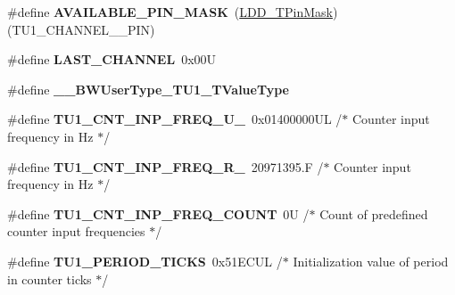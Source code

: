 \begin{DoxyCompactItemize}
\item 
\mbox{\label{group___t_u1__module_gaae26cc68396d232c9dd6aed25157fe4c}} 
\#define {\bfseries A\+V\+A\+I\+L\+A\+B\+L\+E\+\_\+\+P\+I\+N\+\_\+\+M\+A\+SK}~(\hyperlink{group___p_e___types__module_ga210dbf1d49dc5f9d5198e06ad4d96fc3}{L\+D\+D\+\_\+\+T\+Pin\+Mask})(T\+U1\+\_\+\+C\+H\+A\+N\+N\+E\+L\+\_\+\_\+\+P\+IN)
\item 
\mbox{\label{group___t_u1__module_ga23dbf3ce1b12c52cb0db3c47845a3fef}} 
\#define {\bfseries L\+A\+S\+T\+\_\+\+C\+H\+A\+N\+N\+EL}~0x00U
\item 
\mbox{\label{group___t_u1__module_gaf0b58bf613a080724fc73a1d8b13ff39}} 
\#define {\bfseries \+\_\+\+\_\+\+B\+W\+User\+Type\+\_\+\+T\+U1\+\_\+\+T\+Value\+Type}
\item 
\mbox{\label{group___t_u1__module_ga85cc4897457440a2308166668f49da10}} 
\#define {\bfseries T\+U1\+\_\+\+C\+N\+T\+\_\+\+I\+N\+P\+\_\+\+F\+R\+E\+Q\+\_\+\+U\+\_}~0x01400000\+U\+L /$\ast$ Counter input frequency in Hz $\ast$/
\item 
\mbox{\label{group___t_u1__module_ga4913c95039859613c2db9d00795ab5d6}} 
\#define {\bfseries T\+U1\+\_\+\+C\+N\+T\+\_\+\+I\+N\+P\+\_\+\+F\+R\+E\+Q\+\_\+\+R\+\_}~20971395.\+F /$\ast$ Counter input frequency in Hz $\ast$/
\item 
\mbox{\label{group___t_u1__module_ga855f7e71146b18903d56643ec80c5ddb}} 
\#define {\bfseries T\+U1\+\_\+\+C\+N\+T\+\_\+\+I\+N\+P\+\_\+\+F\+R\+E\+Q\+\_\+\+C\+O\+U\+NT}~0\+U      /$\ast$ Count of predefined counter input frequencies $\ast$/
\item 
\mbox{\label{group___t_u1__module_ga17e6ec4b6bb1df9067daf9ac4204db66}} 
\#define {\bfseries T\+U1\+\_\+\+P\+E\+R\+I\+O\+D\+\_\+\+T\+I\+C\+KS}~0x51\+E\+C\+U\+L    /$\ast$ Initialization value of period in \textquotesingle{}counter ticks\textquotesingle{} $\ast$/
\item 
\mbox{\label{group___t_u1__module_ga15dbabf955f2e2b0f888b98320eabfa3}} 

\end{DoxyCompactItemize}
